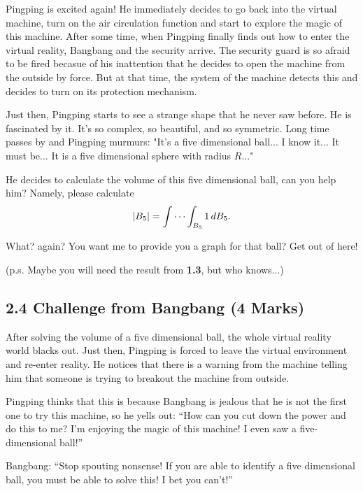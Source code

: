 \documentclass[12pt]{article}
\begin{document}
Pingping is excited again! He immediately decides to go back into the virtual machine, turn on the air 
circulation function and start to explore the magic of this machine. After some time, when Pingping finally 
finds out how to enter the virtual reality, Bangbang and the security arrive. The security guard is so afraid to be 
fired becasue of his inattention that he decides to open the machine from the outside by force. But at that time,
the system of the machine detects this and decides to turn on its protection mechanism. 

\par Just then, Pingping starts to see a strange shape that he never saw before. He is fascinated by it. It's so 
complex, so beautiful, and so symmetric. Long time passes by and Pingping murmurs: "It's a five dimensional ball... I 
know it... It must be... It is a five dimensional sphere with radius $R$..."

He decides to calculate the volume of this five dimensional ball, can you help him? Namely, please calculate 
\begin{equation*}
    \abs{B_5} = \idotsint_{B_5}1 \,dB_5. 
\end{equation*}

What? again? You want me to provide you a graph for that ball? Get out of here!

\hfill (p.s. Maybe you will need the result from \textbf{1.3}, but who knows...)

\subsection*{2.4 Challenge from Bangbang (4 Marks)}

After solving the volume of a five dimensional ball, the whole virtual reality world blacks out. Just then, 
Pingping is forced to leave the virtual environment and re-enter reality. He notices that there is a warning from the machine 
telling him that someone is trying to breakout the machine from outside. 

Pingping thinks that this is because Bangbang is jealous that he is not the first one to try this machine, so he
yells out: ``How can you cut down the power and do this to me? I'm enjoying the magic of this machine! I even 
saw a five-dimensional ball!''

\par Bangbang: ``Stop spouting nonsense! If you are able to identify a five dimensional ball, you must be able to
solve this! I bet you can't!''
\end{document}
